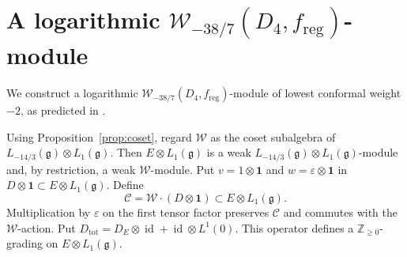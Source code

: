 \documentclass[11pt]{amsart}
\numberwithin{equation}{section}
\theoremstyle{definition}
\theoremstyle{remark}
\newcommand{\ZZ}{\mathbb Z}
\newcommand{\g}{\mathfrak g}
\newcommand{\one}{\mathbf1}
\newcommand{\W}{\mathcal W}
\newcommand{\reg}{\mathrm{reg}}
\newcommand{\id}{\operatorname{id}}
\begin{document}
\section{A logarithmic \texorpdfstring{$\W_{-38/7}(D_4,f_{\reg})$}{W(-38/7)(D4, f reg)}-module}
\label{sec:logarithmic}

We construct a logarithmic $\W_{-38/7}(D_4,f_{\reg})$-module
of lowest conformal weight $-2$, as predicted in \cite{Xie}.
\vskip 5mm


Using Proposition~\ref{prop:coset}, regard $\mathcal W$ as the
coset subalgebra of $L_{-14/3}(\g)\otimes L_1(\g)$.
Then $E\otimes L_1(\g)$ is a weak
$L_{-14/3}(\g)\otimes L_1(\g)$-module and, by restriction,
a weak $\mathcal W$-module.
Put $v=1\otimes\one$ and $w=\varepsilon\otimes\one$ in
$D\otimes\one\subset E\otimes L_1(\g)$. Define
\begin{equation}\label{eq:C}
 \mathcal C=\mathcal W\cdot( D\otimes\one)
 \subset E\otimes L_1(\g).
\end{equation}
Multiplication by $\varepsilon$ on the first tensor factor preserves
$\mathcal C$ and commutes with the $\mathcal W$-action. Put
$
 D_{\mathrm{tot}}=D_E\otimes\id+\id\otimes L^1(0)$. 
This operator defines a $\ZZ_{\geq0}$-grading on $E\otimes L_1(\g)$.
\end{document}
